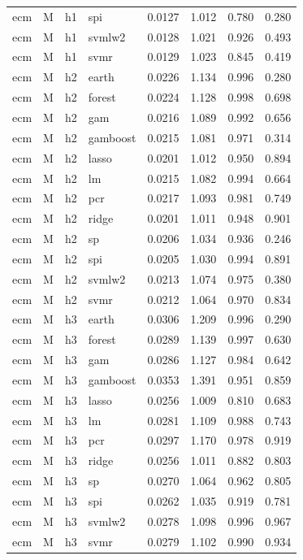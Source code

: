 \begin{ThreePartTable}
\begin{longtable}[t]{llclcccc}
ecm & M & h1 & spi & 0.0127 & 1.012 & 0.780 & 0.280\\
ecm & M & h1 & svmlw2 & 0.0128 & 1.021 & 0.926 & 0.493\\
ecm & M & h1 & svmr & 0.0129 & 1.023 & 0.845 & 0.419\\
\addlinespace
ecm & M & h2 & earth & 0.0226 & 1.134 & 0.996 & 0.280\\
ecm & M & h2 & forest & 0.0224 & 1.128 & 0.998 & 0.698\\
ecm & M & h2 & gam & 0.0216 & 1.089 & 0.992 & 0.656\\
ecm & M & h2 & gamboost & 0.0215 & 1.081 & 0.971 & 0.314\\
ecm & M & h2 & lasso & 0.0201 & 1.012 & 0.950 & 0.894\\
ecm & M & h2 & lm & 0.0215 & 1.082 & 0.994 & 0.664\\
ecm & M & h2 & pcr & 0.0217 & 1.093 & 0.981 & 0.749\\
ecm & M & h2 & ridge & 0.0201 & 1.011 & 0.948 & 0.901\\
ecm & M & h2 & sp & 0.0206 & 1.034 & 0.936 & 0.246\\
ecm & M & h2 & spi & 0.0205 & 1.030 & 0.994 & 0.891\\
ecm & M & h2 & svmlw2 & 0.0213 & 1.074 & 0.975 & 0.380\\
ecm & M & h2 & svmr & 0.0212 & 1.064 & 0.970 & 0.834\\
\addlinespace
ecm & M & h3 & earth & 0.0306 & 1.209 & 0.996 & 0.290\\
ecm & M & h3 & forest & 0.0289 & 1.139 & 0.997 & 0.630\\
ecm & M & h3 & gam & 0.0286 & 1.127 & 0.984 & 0.642\\
ecm & M & h3 & gamboost & 0.0353 & 1.391 & 0.951 & 0.859\\
ecm & M & h3 & lasso & 0.0256 & 1.009 & 0.810 & 0.683\\
ecm & M & h3 & lm & 0.0281 & 1.109 & 0.988 & 0.743\\
ecm & M & h3 & pcr & 0.0297 & 1.170 & 0.978 & 0.919\\
ecm & M & h3 & ridge & 0.0256 & 1.011 & 0.882 & 0.803\\
ecm & M & h3 & sp & 0.0270 & 1.064 & 0.962 & 0.805\\
ecm & M & h3 & spi & 0.0262 & 1.035 & 0.919 & 0.781\\
ecm & M & h3 & svmlw2 & 0.0278 & 1.098 & 0.996 & 0.967\\
ecm & M & h3 & svmr & 0.0279 & 1.102 & 0.990 & 0.934\\

\end{longtable}
\end{ThreePartTable}

